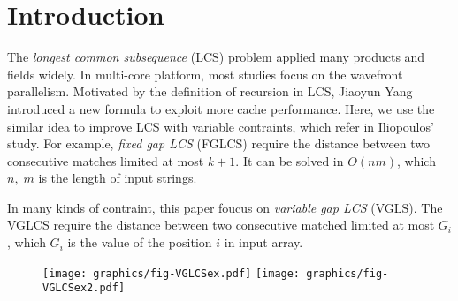 \section{Introduction} %
\label{sec:Introduction}

The \emph{longest common subsequence} (LCS) problem applied many products and fields widely.  In multi-core platform, most studies focus on the wavefront parallelism. Motivated by the definition of recursion in LCS, Jiaoyun Yang introduced a new formula to exploit more cache performance.  Here, we use the similar idea to improve LCS with variable contraints, which refer in Iliopoulos' study.  For example, \emph{fixed gap LCS} (FGLCS) require the distance between two consecutive matches limited at most $k+1$.  It can be solved in $O(nm)$, which $n, \; m$ is the length of input strings.

In many kinds of contraint, this paper foucus on \emph{variable gap LCS} (VGLS). The VGLCS require the distance between two consecutive matched limited at most $G_i$, which $G_i$ is the value of the position $i$ in input array.

\begin{figure}[!thb]
  \centering
  \texttt{[image: graphics/fig-VGLCSex.pdf]}
  \texttt{[image: graphics/fig-VGLCSex2.pdf]}
  \caption{}
  \label{fig:VGLCSex}
\end{figure}